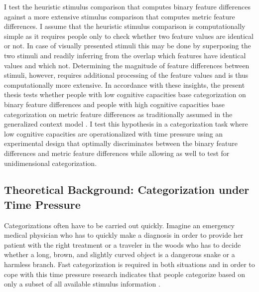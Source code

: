 \documentclass[a4paper,man,natbib]{apa6}
\begin{document}
I test the heuristic stimulus comparison that computes binary feature differences against a more extensive stimulus comparison that computes metric feature differences. I assume that the heuristic stimulus comparison is computationally simple as it requires people only to check whether two feature values are identical or not. In case of visually presented stimuli this may be done by superposing the two stimuli and readily inferring from the overlap which features have identical values and which not. Determining the magnitude of feature differences between stimuli, however, requires additional processing of the feature values and is thus computationally more extensive.
In accordance with these insights, the present thesis tests whether people with low cognitive capacities base categorization on binary feature differences and people with high cognitive capacities base categorization on metric feature differences as traditionally assumed in the generalized context model \citep{nosofsky1986attention}. I test this hypothesis in a categorization task where low cognitive capacities are operationalized with time pressure using an experimental design that optimally discriminates between the binary feature differences and metric feature differences while allowing as well to test for unidimensional categorization. 


\subsection{Theoretical Background: Categorization under Time Pressure}
Categorizations often have to be carried out quickly. Imagine an emergency medical physician who has to quickly make a diagnosis in order to provide her patient with the right treatment or a traveler in the woods who has to decide whether a long, brown, and slightly curved object is a dangerous snake or a harmless branch. Fast categorization is required in both situations and in order to cope with this time pressure research indicates that people categorize based on only a subset of all available stimulus information \citep{lamberts1995categorization}. 
\end{document}
